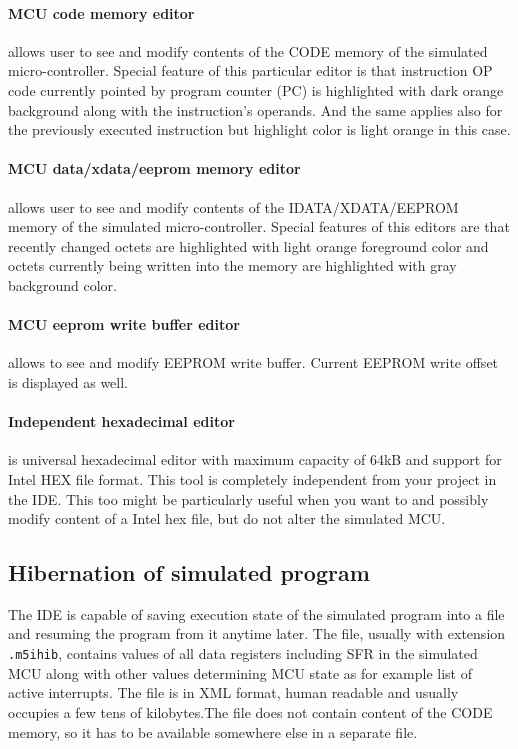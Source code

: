 \documentclass[a4paper,twoside,12pt]{book}
\newcommand{\fileextension}[1]{\texttt{#1}}
\begin{document}
			\paragraph{MCU code memory editor} allows user to see and modify contents of the CODE memory of the simulated micro-controller. Special feature of this particular editor is that instruction OP code currently pointed by program counter (PC) is highlighted with dark orange background along with the instruction's operands. And the same applies also for the previously executed instruction but highlight color is light orange in this case.

			\paragraph{MCU data/xdata/eeprom memory editor} allows user to see and modify contents of the IDATA/XDATA/EEPROM memory of the simulated micro-controller. Special features of this editors are that recently changed octets are highlighted with light orange foreground color and octets currently being written into the memory are highlighted with gray background color.

			\paragraph{MCU eeprom write buffer editor} allows to see and modify EEPROM write buffer. Current EEPROM write offset is displayed as well.

			\paragraph{Independent hexadecimal editor} is universal hexadecimal editor with maximum capacity of 64kB and support for Intel HEX file format. This tool is completely independent from your project in the IDE. This too might be particularly useful when you want to and possibly modify content of a Intel hex file, but do not alter the simulated MCU.

		\subsection{Hibernation of simulated program}
			The IDE is capable of saving execution state of the simulated program into a file and resuming the program from it anytime later. The file, usually with extension \fileextension{.m5ihib}, contains values of all data registers including SFR in the simulated MCU along with other values determining MCU state as for example list of active interrupts. The file is in XML format, human readable and usually occupies a few tens of kilobytes.The file does not contain content of the CODE memory, so it has to be available somewhere else in a separate file.
\end{document}
